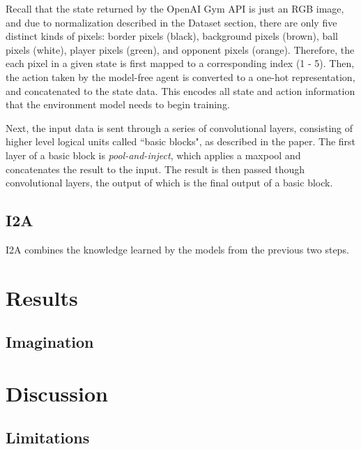 \documentclass[10pt, twocolumn]{article}
\begin{document}
Recall that the state returned by the OpenAI Gym API is just an RGB image, and due to normalization 
described in the Dataset section, there are only five distinct kinds of pixels: border pixels (black),
background pixels (brown), ball pixels (white), player pixels (green), and opponent pixels (orange).
Therefore, the each pixel in a given state is first mapped to a corresponding index (1 - 5). Then, the action
taken by the model-free agent is converted to a one-hot representation, and concatenated to the
state data. This encodes all state and action information that the environment model needs to begin training.

Next, the input data is sent through a series of convolutional layers, consisting of higher level logical units
called ``basic blocks", as described in the paper. The first layer of a basic block is \emph{pool-and-inject},
which applies a maxpool and concatenates the result to the input. The result is then passed though
convolutional layers, the output of which is the final output of a basic block.



\subsection{I2A}

I2A combines the knowledge learned by the models from the previous two steps.

\section{Results}

\subsection{Imagination}

\section{Discussion}

\subsection{Limitations}
\end{document}

